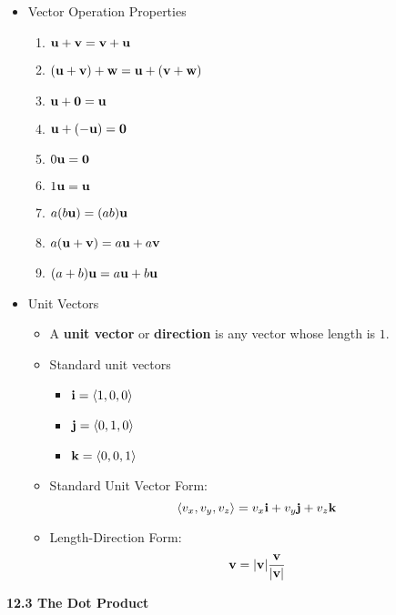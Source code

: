 \begin{itemize}
  \item Vector Operation Properties
    \begin{enumerate}
    \item $\mathbf{u}+\mathbf{v} = \mathbf{v}+\mathbf{u}$
    \item $(\mathbf{u}+\mathbf{v})+\mathbf{w} = \mathbf{u}+(\mathbf{v}+\mathbf{w})$
    \item $\mathbf{u}+\mathbf{0} = \mathbf{u}$
    \item $\mathbf{u}+(-\mathbf{u}) = \mathbf{0}$
    \item $0\mathbf{u} = \mathbf{0}$
    \item $1\mathbf{u} = \mathbf{u}$
    \item $a(b\mathbf{u}) = (ab)\mathbf{u}$
    \item $a(\mathbf{u} + \mathbf{v}) = a\mathbf{u} + a\mathbf{v}$
    \item $(a+b)\mathbf{u} = a\mathbf{u} + b\mathbf{u}$
    \end{enumerate}

  \item Unit Vectors
    \begin{itemize}
    \item A \textbf{unit vector} or \textbf{direction} is any vector whose length is $1$.
    
    \item Standard unit vectors
      \begin{itemize}
      \item $\mathbf{i} = \left<1,0,0\right>$
      \item $\mathbf{j} = \left<0,1,0\right>$
      \item $\mathbf{k} = \left<0,0,1\right>$
      \end{itemize}

    \item Standard Unit Vector Form:
      \[\left<v_x,v_y,v_z\right> = v_x\mathbf{i} + v_y\mathbf{j} + v_z\mathbf{k}\]

    \item Length-Direction Form:
      \[\mathbf{v} = |\mathbf{v}|\frac{\mathbf{v}}{|\mathbf{v}|}\]

    \end{itemize}
  \end{itemize}

\hr
  
\centerline{\bf 12.3 The Dot Product}
  
